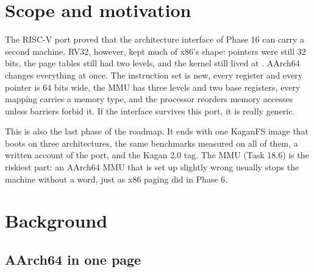 \documentclass[11pt,a4paper]{article}
\begin{document}


\section{Scope and motivation}

The RISC-V port proved that the architecture interface of Phase 16 can carry a second machine. RV32, however, kept much of
x86's shape: pointers were still 32 bits, the page tables still had two levels, and the kernel still lived at
. AArch64 changes everything at once. The instruction set is new, every register and every pointer
is 64 bits wide, the MMU has three levels and two base registers, every mapping carries a memory type, and the
processor reorders memory accesses unless barriers forbid it. If the interface survives this port, it is really
generic.

This is also the last phase of the roadmap. It ends with one KaganFS image that boots on three architectures, the
same benchmarks measured on all of them, a written account of the port, and the Kagan 2.0 tag. The MMU
(Task 18.6) is the riskiest part: an AArch64 MMU that is set up slightly wrong usually
stops the machine without a word, just as x86 paging did in Phase 6.

\section{Background}

\subsection{AArch64 in one page}
\end{document}

